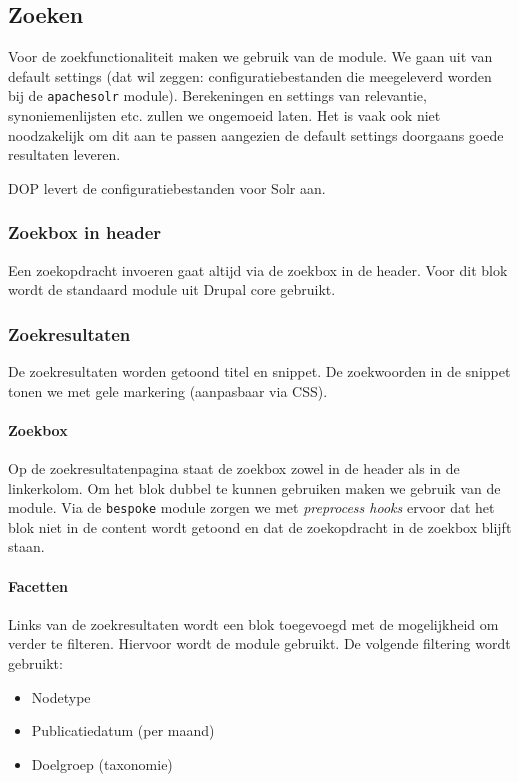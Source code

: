 \subsection{Zoeken}\label{zoeken}
Voor de zoekfunctionaliteit maken we gebruik van de  module. We gaan uit van default settings (dat wil zeggen: configuratiebestanden die meegeleverd worden bij de \texttt{apachesolr} module). Berekeningen en settings van relevantie, synoniemenlijsten etc. zullen we ongemoeid laten. Het is vaak ook niet noodzakelijk om dit aan te passen aangezien de default settings doorgaans goede resultaten leveren.

DOP levert de configuratiebestanden voor Solr aan.

\subsubsection{Zoekbox in header}
Een zoekopdracht invoeren gaat altijd via de zoekbox in de header. Voor dit blok wordt de standaard  module uit Drupal core gebruikt.

\subsubsection{Zoekresultaten}
De zoekresultaten worden getoond titel en snippet. De zoekwoorden in de snippet tonen we met gele markering (aanpasbaar via CSS).

\paragraph{Zoekbox}
Op de zoekresultatenpagina staat de zoekbox zowel in de header als in de linkerkolom. Om het blok dubbel te kunnen gebruiken maken we gebruik van de  module. Via de \texttt{bespoke} module zorgen we met \emph{preprocess hooks} ervoor dat het blok niet in de content wordt getoond en dat de zoekopdracht in de zoekbox blijft staan.

\paragraph{Facetten}
Links van de zoekresultaten wordt een blok toegevoegd met de mogelijkheid om verder te filteren. Hiervoor wordt de  module gebruikt. De volgende filtering wordt gebruikt:
\begin{itemize}
\item Nodetype
\item Publicatiedatum (per maand)
\item Doelgroep (taxonomie)
\end{itemize}

